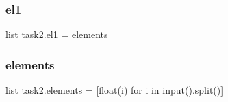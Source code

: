 \subsubsection{\texorpdfstring{el1}{el1}}
{\footnotesize\ttfamily list task2.\+el1 = \hyperlink{namespacetask2_aa48258fb49cab33676172ceb559d8c7d}{elements}}

\mbox{\label{namespacetask2_aa48258fb49cab33676172ceb559d8c7d}} 
\subsubsection{\texorpdfstring{elements}{elements}}
{\footnotesize\ttfamily list task2.\+elements = \mbox{[}float(i) for i in input().split()\mbox{]}}

